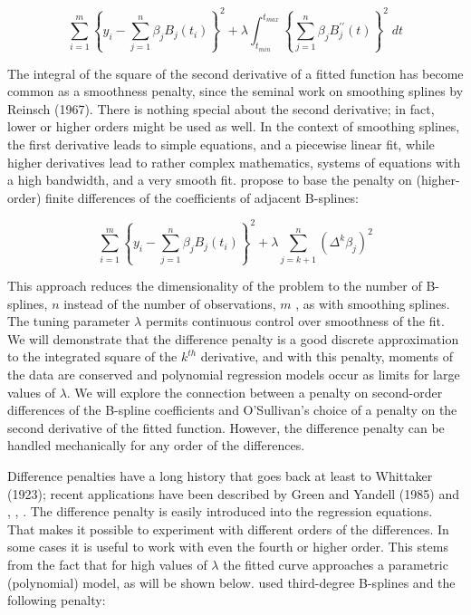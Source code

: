 \documentclass[12pt]{article}
\newcommand*\needsparaphrased{\color{red}}
\begin{document}
\begin{equation} \label{eq:univariate_bspline_ridge_penalty}
\sum_{i=1}^m \left \{ y_i - \sum_{j=1}^n \beta_j B_j\left(t_i\right) \right \}^2 + \lambda \int_{t_{min}}^{t_{max}} \left\{  \sum_{j=1}^n \beta_j B^{\prime \prime}_j\left(t\right) \right\}^2 \; dt
\end{equation}



{ \needsparaphrased The integral of the square of the second derivative of a fitted function has become common as a smoothness penalty, since the seminal work on smoothing splines by Reinsch (1967). There is nothing special about the second derivative; in fact, lower or higher orders might be used as well. In the context of smoothing splines, the first derivative leads to simple equations, and a piecewise linear fit, while higher derivatives lead to rather complex mathematics, systems of equations with a high bandwidth, and a very smooth fit. \cite{eilers1996flexible} propose to base the penalty on (higher-order) finite differences of the coefficients of adjacent B-splines:}

\begin{equation} \label{eq:univariate_pspline_diff_penalty}
\sum_{i=1}^m \left \{ y_i - \sum_{j=1}^n \beta_j B_j\left(t_i\right) \right \}^2 + \lambda \sum_{j=k+1}^n \left( \Delta^k \beta_j  \right)^2
\end{equation}

This approach reduces the dimensionality of the problem to the number of B-splines, $n$ instead of the number of observations, $m$ , as with smoothing splines. The tuning parameter $\lambda$ permits continuous control over smoothness of the fit. We will demonstrate that the difference penalty is a good discrete approximation to the integrated square of the $k^{th}$ derivative, and with this penalty, moments of the data are conserved and polynomial regression models occur as limits for large values of $\lambda$. We will explore the connection between a penalty on second-order differences of the B-spline coefficients and O'Sullivan's choice of a penalty on the second derivative of the fitted function. However, the difference penalty can be handled mechanically for any order of the differences.

{ \needsparaphrased Difference penalties have a long history that goes back at least to Whittaker (1923); recent applications have been described by Green and Yandell (1985) and \cite{eilers1991penalized}, \cite{eilers1991nonparametric}, \cite{eilers1995indirect}. The difference penalty is easily introduced into the regression equations. That makes it possible to experiment with different orders of the differences. In some cases it is useful to work with even the fourth or higher order. This stems from the fact that for high values of $\lambda$ the fitted curve approaches a parametric (polynomial) model, as will be shown below.
\cite{o1986statistical} used third-degree B-splines and the following penalty:}
\end{document}
